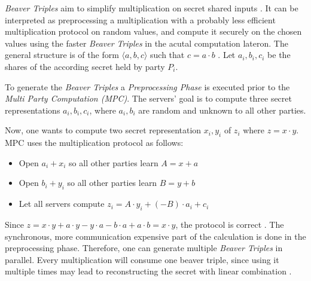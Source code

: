 \label{sub:BeaverTriples}
\textit{Beaver Triples} aim to simplify multiplication on secret shared inputs \cite{pullonen2013actively}.
It can be interpreted as preprocessing a multiplication with a probably less efficient multiplication protocol on random values, and compute it securely on the chosen values using the faster \textit{Beaver Triples} in the acutal computation lateron.
The general structure is of the form $\langle a,b,c\rangle$ such that $c=a\cdot b$ \cite{pullonen2013actively}.
Let $a_i,b_i,c_i$ be the shares of the according secret held by party $P_i$.

To generate the \textit{Beaver Triples} a \textit{Preprocessing Phase} is executed prior to the \textit{Multi Party Computation (MPC)}. 
The servers' goal is to compute three secret representations $a_i,b_i,c_i$, where $a_i,b_i$ are random and unknown to all other parties.

Now, one wants to compute two secret representation $x_i,y_i$ of $z_i$ where $z=x\cdot y$.
MPC uses the multiplication protocol as follows:
\begin{itemize}
    \item Open $a_i+x_i$ so all other parties learn $A=x+a$
    \item Open $b_i+y_i$ so all other parties learn $B=y+b$
    \item Let all servers compute $z_i=A\cdot y_i+(-B)\cdot a_i+c_i$
\end{itemize}
Since $z=x\cdot y+a\cdot y-y\cdot a-b\cdot a+a\cdot b=x\cdot y$, the protocol is correct \cite{medium2024beaver}.
The synchronous, more communication expensive part of the calculation is done in the preprocessing phase.
Therefore, one can generate multiple \textit{Beaver Triples} in parallel.
Every multiplication will consume one beaver triple, since using it multiple times may lead to reconstructing the secret with linear combination \cite{pullonen2013actively}.